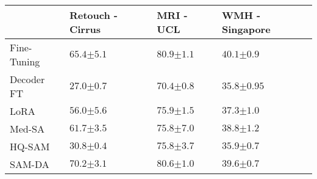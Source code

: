 \begin{table}[]
\centering
\begin{tabular}{@{}lP{2.5cm}P{2.5cm}P{3cm}@{}}
\toprule
 & Retouch - Cirrus & MRI - UCL & WMH - Singapore \\ \midrule
Fine-Tuning & $65.4{\scriptscriptstyle \pm 5.1}$ & $80.9{\scriptscriptstyle \pm 1.1}$ & $40.1{\scriptscriptstyle \pm 0.9}$ \\ \midrule
Decoder FT & $27.0{\scriptscriptstyle \pm 0.7}$ & $70.4{\scriptscriptstyle \pm 0.8}$ & $35.8{\scriptscriptstyle \pm 0.95}$ \\
LoRA~\cite{hu2022lora} & $56.0{\scriptscriptstyle \pm 5.6}$ & $75.9{\scriptscriptstyle \pm 1.5}$ & $37.3{\scriptscriptstyle \pm 1.0}$ \\
Med-SA~\cite{wu2023medical} & $61.7{\scriptscriptstyle \pm 3.5}$ & $75.8{\scriptscriptstyle \pm 7.0}$ & $38.8{\scriptscriptstyle \pm 1.2}$ \\
HQ-SAM~\cite{ke2024segment} & $30.8{\scriptscriptstyle \pm 0.4}$ & $75.8{\scriptscriptstyle \pm 3.7}$ & $35.9{\scriptscriptstyle \pm 0.7}$ \\ \midrule
SAM-DA & $\mathbf{70.2}{\scriptscriptstyle \pm 3.1}$ & $\mathbf{80.6}{\scriptscriptstyle \pm 1.0}$ & $\mathbf{39.6}{\scriptscriptstyle \pm 0.7}$ \\ \bottomrule
\end{tabular}
\end{table}




